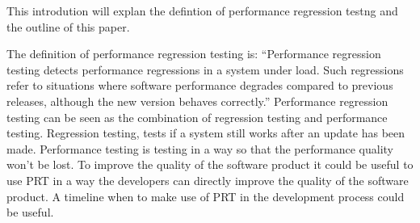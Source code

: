 This introdution will explan the defintion of performance regression testng and the outline of this paper. \newline \newline


The definition of performance regression testing is: ``Performance regression testing detects performance
regressions in a system under load. Such regressions refer to
situations where software performance degrades compared to
previous releases, although the new version behaves correctly.''\cite{Definition}
Performance regression testing can be seen as the combination of regression testing and performance testing. Regression testing, tests if a system still works after an update has been made. Performance testing is testing in a way so that the performance quality won't be lost.
To improve the quality of the software product it could be useful to use PRT in a way the developers can
directly improve the quality of the software product. A timeline when to make use of PRT in the development
process could be useful.
